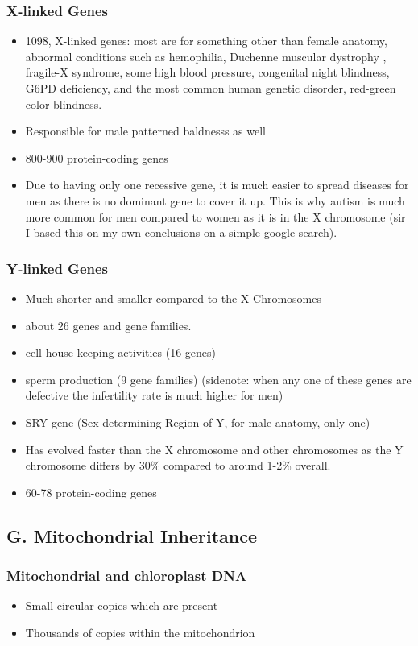 \documentclass{article}
\begin{document}
\subsubsection*{X-linked Genes}
\begin{itemize}
    \item 1098, X-linked genes: most are for something other than female anatomy, abnormal conditions such as hemophilia, Duchenne muscular dystrophy , fragile-X syndrome, some high blood pressure, congenital night blindness, G6PD deficiency, and the most common human genetic disorder, red-green color blindness.
    \item Responsible for male patterned baldnesss as well
    \item 800-900 protein-coding genes
    \item Due to having only one recessive gene, it is much easier to spread diseases for men as there is no dominant gene to cover it up. This is why autism is much more common for men compared to women as it is in the X chromosome (sir I based this on my own conclusions on a simple google search).
\end{itemize}
\subsubsection*{Y-linked Genes}
\begin{itemize}
    \item Much shorter and smaller compared to the X-Chromosomes
    \item about 26 genes and gene families.
    \item cell house-keeping activities (16 genes)
    \item sperm production (9 gene families) (sidenote: when any one of these genes are defective the infertility rate is much higher for men)
    \item SRY gene (Sex-determining Region of Y, for male anatomy, only one)
    \item Has evolved faster than the X chromosome and other chromosomes as the Y chromosome differs by 30\% compared to around 1-2\% overall.
    \item 60-78 protein-coding genes
\end{itemize}
\subsection*{G. Mitochondrial Inheritance}
\subsubsection*{Mitochondrial and chloroplast DNA}
\begin{itemize}
    \item Small circular copies which are present
    \item Thousands of copies within the mitochondrion
\end{itemize}
\end{document}
